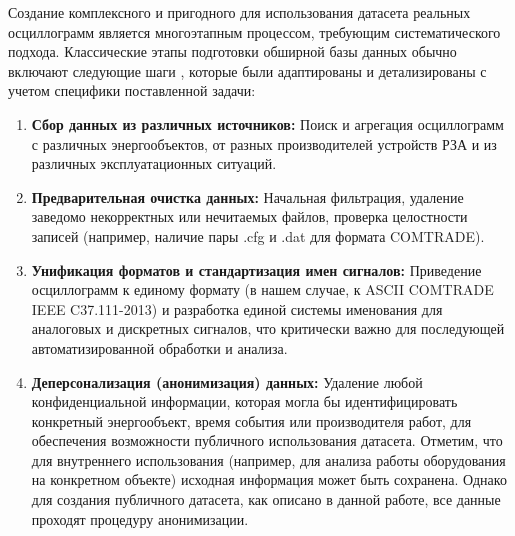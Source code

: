 Создание комплексного и пригодного для использования датасета реальных осциллограмм
является многоэтапным процессом, требующим систематического подхода. Классические этапы
подготовки обширной базы данных обычно включают следующие шаги
\cite{bavr_bib_088_h_2021,bavr_bib_089_q_2024,bavr_bib_090_s_2023,bavr_bib_091_s_2021},
которые были адаптированы и детализированы с учетом специфики поставленной
задачи:\par\vspace{0.2cm}

\begin{enumerate}[label=\arabic*),itemsep=0pt,topsep=2pt]
  \item \textbf{Сбор данных из различных источников:} Поиск и агрегация осциллограмм с различных энергообъектов, от разных производителей устройств РЗА и из различных эксплуатационных ситуаций.
  \item \textbf{Предварительная очистка данных:} Начальная фильтрация, удаление заведомо некорректных или нечитаемых файлов, проверка целостности записей (например, наличие пары .cfg и .dat для формата COMTRADE).
  \item \textbf{Унификация форматов и стандартизация имен сигналов:} Приведение осциллограмм к единому формату (в нашем случае, к ASCII COMTRADE IEEE C37.111-2013) и разработка единой системы именования для аналоговых и дискретных сигналов, что критически важно для последующей автоматизированной обработки и анализа.
  \item \textbf{Деперсонализация (анонимизация) данных:} Удаление любой конфиденциальной информации, которая могла бы идентифицировать конкретный энергообъект, время события или производителя работ, для обеспечения возможности публичного использования датасета. Отметим, что для внутреннего использования (например, для анализа работы оборудования на конкретном объекте) исходная информация может быть сохранена. Однако для создания публичного датасета, как описано в данной работе, все данные проходят процедуру анонимизации.

\end{enumerate}
